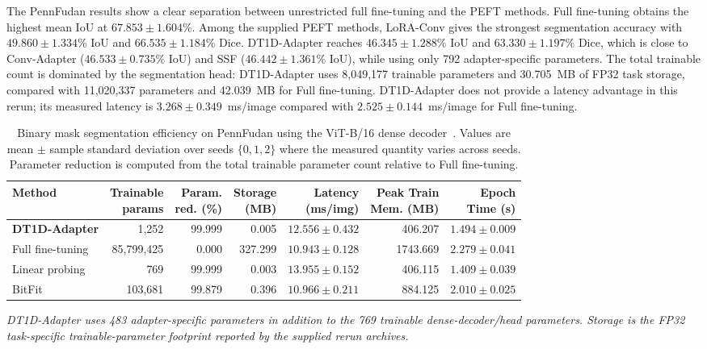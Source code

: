 \documentclass[pdflatex,sn-mathphys-num]{sn-jnl}
\theoremstyle{thmstyleone}
\theoremstyle{thmstyletwo}
\theoremstyle{thmstylethree}
\begin{document}
The PennFudan results show a clear separation between unrestricted full fine-tuning and the PEFT methods. Full fine-tuning obtains the highest mean IoU at $67.853\pm1.604\%$. Among the supplied PEFT methods, LoRA-Conv gives the strongest segmentation accuracy with $49.860\pm1.334\%$ IoU and $66.535\pm1.184\%$ Dice. DT1D-Adapter reaches $46.345\pm1.288\%$ IoU and $63.330\pm1.197\%$ Dice, which is close to Conv-Adapter ($46.533\pm0.735\%$ IoU) and SSF ($46.442\pm1.361\%$ IoU), while using only 792 adapter-specific parameters. The total trainable count is dominated by the segmentation head: DT1D-Adapter uses 8,049,177 trainable parameters and 30.705~MB of FP32 task storage, compared with 11,020,337 parameters and 42.039~MB for Full fine-tuning. DT1D-Adapter does not provide a latency advantage in this rerun; its measured latency is $3.268\pm0.349$~ms/image compared with $2.525\pm0.144$~ms/image for Full fine-tuning.


\begin{table}[!htbp]
\centering
\caption{Binary mask segmentation efficiency on PennFudan using the ViT-B/16 dense decoder~\cite{dosovitskiy2021vit}. Values are mean $\pm$ sample standard deviation over seeds $\{0,1,2\}$ where the measured quantity varies across seeds. Parameter reduction is computed from the total trainable parameter count relative to Full fine-tuning.}
\label{tab:seg_eff_vit_pennfudan}
\scriptsize
\setlength{\tabcolsep}{2.6pt}
\renewcommand{\arraystretch}{1.12}
\begin{tabularx}{\textwidth}{@{}Xrrrrrr@{}}
\toprule
\textbf{Method} &
\makecell{\textbf{Trainable}\\\textbf{params}} &
\makecell{\textbf{Param.}\\\textbf{red. (\%)}} &
\makecell{\textbf{Storage}\\\textbf{(MB)}} &
\makecell{\textbf{Latency}\\\textbf{(ms/img)}} &
\makecell{\textbf{Peak Train}\\\textbf{Mem. (MB)}} &
\makecell{\textbf{Epoch}\\\textbf{Time (s)}} \\
\midrule
\textbf{DT1D-Adapter} & 1,252 & 99.999 & 0.005 & $12.556\pm0.432$ & 406.207 & $1.494\pm0.009$ \\
Full fine-tuning & 85,799,425 & 0.000 & 327.299 & $10.943\pm0.128$ & 1743.669 & $2.279\pm0.041$ \\
Linear probing & 769 & 99.999 & 0.003 & $13.955\pm0.152$ & 406.115 & $1.409\pm0.039$ \\
BitFit~\cite{zaken2022bitfit} & 103,681 & 99.879 & 0.396 & $10.966\pm0.211$ & 884.125 & $2.010\pm0.025$ \\
\bottomrule
\end{tabularx}

\vspace{2pt}
{\footnotesize\textit{DT1D-Adapter uses 483 adapter-specific parameters in addition to the 769 trainable dense-decoder/head parameters. Storage is the FP32 task-specific trainable-parameter footprint reported by the supplied rerun archives.}}
\end{table}
\end{document}
